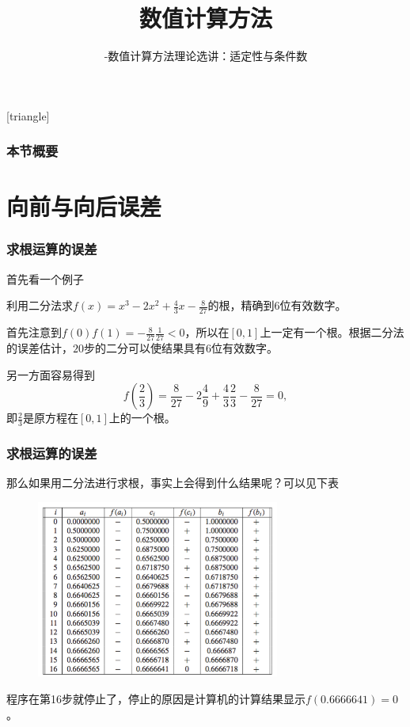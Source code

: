 \documentclass[10pt]{beamer}
\title[数值计算方法]{数值计算方法}
\subtitle{-数值计算方法理论选讲：适定性与条件数}
\begin{document}
[triangle]

\begin{frame}
\titlepage
\end{frame}


\begin{frame}
  \frametitle{本节概要}
  \tableofcontents%
\end{frame}

\section{向前与向后误差}

\begin{frame}
\frametitle{求根运算的误差}
首先看一个例子
\begin{example}
利用二分法求$f(x) = x^3 - 2x^2 + \frac{4}{3}x - \frac{8}{27}$的根，精确到6位有效数字。
\end{example}
首先注意到$f(0)f(1) = -\frac{8}{27}\frac{1}{27} <0$，所以在$[0,1]$上一定有一个根。根据二分法的误差估计，$20$步的二分可以使结果具有6位有效数字。

\vspace{0.1cm}

另一方面容易得到
\begin{equation}
f(\frac{2}{3}) = \frac{8}{27} - 2\frac{4}{9} + \frac{4}{3} \frac{2}{3} - \frac{8}{27} = 0,
\end{equation}
即$\frac{2}{3}$是原方程在$[0,1]$上的一个根。
\end{frame}


\begin{frame}
\frametitle{求根运算的误差}
那么如果用二分法进行求根，事实上会得到什么结果呢？可以见下表
\begin{figure}
\includegraphics[width=8cm]{figs/1-3-1_Foward&Backward_Error-1} 
\end{figure}
程序在第16步就停止了，停止的原因是计算机的计算结果显示$f(0.6666641)=0$。
\end{frame}
\end{document}
